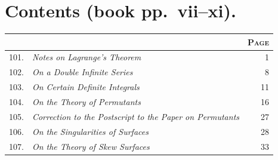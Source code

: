 \documentclass[11pt]{article}
\begin{document}
\section*{Contents (book pp.\ vii--xi).}

\renewcommand{\arraystretch}{1.1}
\begin{longtable}{@{}r p{} r@{}}
 & & \textsc{Page} \\
\endhead
101. & \emph{Notes on Lagrange's Theorem} \dotfill \par
\hspace{1em}{\footnotesize Camb.\ and Dubl.\ Math.\ Jour.\ t.\ vi.\ (1851), pp.\ 37---45} & 1 \\
102. & \emph{On a Double Infinite Series} \dotfill \par
\hspace{1em}{\footnotesize Camb.\ and Dubl.\ Math.\ Jour.\ t.\ vi.\ (1851), pp.\ 45---47} & 8 \\
103. & \emph{On Certain Definite Integrals} \dotfill \par
\hspace{1em}{\footnotesize Camb.\ and Dubl.\ Math.\ Jour.\ t.\ vi.\ (1851), pp.\ 136---140} & 11 \\
104. & \emph{On the Theory of Permutants} \dotfill \par
\hspace{1em}{\footnotesize Camb.\ and Dubl.\ Math.\ Jour.\ t.\ vii.\ (1852), pp.\ 40---51} & 16 \\
105. & \emph{Correction to the Postscript to the Paper on Permutants} \dotfill \par
\hspace{1em}{\footnotesize Camb.\ and Dubl.\ Math.\ Jour.\ t.\ vii.\ (1852), pp.\ 97---98} & 27 \\
106. & \emph{On the Singularities of Surfaces} \dotfill \par
\hspace{1em}{\footnotesize Camb.\ and Dubl.\ Math.\ Jour.\ t.\ vii.\ (1852), pp.\ 166---171} & 28 \\
107. & \emph{On the Theory of Skew Surfaces} \dotfill \par
\hspace{1em}{\footnotesize Camb.\ and Dubl.\ Math.\ Jour.\ t.\ vii.\ (1852), pp.\ 171---173} & 33 \\

\end{longtable}
\end{document}
